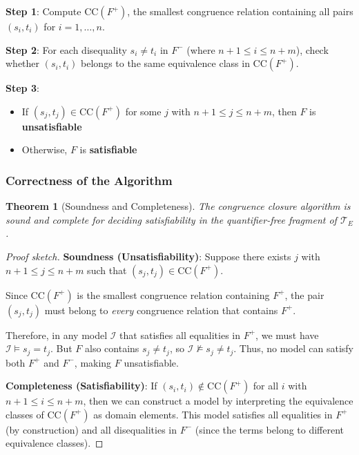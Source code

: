 \documentclass[11pt,a4paper]{article}
\theoremstyle{definition}
\theoremstyle{plain}
\newtheorem{theorem}{Theorem}[section]
\theoremstyle{remark}
\begin{document}
\textbf{Step 1}: Compute $\text{CC}(F^+)$, the smallest congruence relation containing all pairs $(s_i, t_i)$ for $i = 1, \dots, n$.

\textbf{Step 2}: For each disequality $s_i \neq t_i$ in $F^-$ (where $n+1 \leq i \leq n+m$), check whether $(s_i, t_i)$ belongs to the same equivalence class in $\text{CC}(F^+)$.

\textbf{Step 3}: 
\begin{itemize}
    \item If $(s_j, t_j) \in \text{CC}(F^+)$ for some $j$ with $n+1 \leq j \leq n+m$, then $F$ is \textbf{unsatisfiable}
    \item Otherwise, $F$ is \textbf{satisfiable}
\end{itemize}

\begin{center}
\end{center}

\subsubsection{Correctness of the Algorithm}

\begin{theorem}[Soundness and Completeness]
The congruence closure algorithm is sound and complete for deciding satisfiability in the quantifier-free fragment of $\mathcal{T}_E$.
\end{theorem}

\begin{proof}[Proof sketch]
\textbf{Soundness (Unsatisfiability)}: Suppose there exists $j$ with $n+1 \leq j \leq n+m$ such that $(s_j, t_j) \in \text{CC}(F^+)$. 

Since $\text{CC}(F^+)$ is the smallest congruence relation containing $F^+$, the pair $(s_j, t_j)$ must belong to \emph{every} congruence relation that contains $F^+$. 

Therefore, in any model $\mathcal{I}$ that satisfies all equalities in $F^+$, we must have $\mathcal{I} \models s_j = t_j$. But $F$ also contains $s_j \neq t_j$, so $\mathcal{I} \not\models s_j \neq t_j$. Thus, no model can satisfy both $F^+$ and $F^-$, making $F$ unsatisfiable.

\textbf{Completeness (Satisfiability)}: If $(s_i, t_i) \notin \text{CC}(F^+)$ for all $i$ with $n+1 \leq i \leq n+m$, then we can construct a model by interpreting the equivalence classes of $\text{CC}(F^+)$ as domain elements. This model satisfies all equalities in $F^+$ (by construction) and all disequalities in $F^-$ (since the terms belong to different equivalence classes).
\end{proof}
\end{document}
